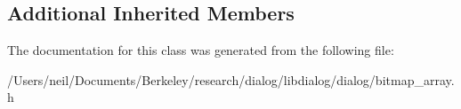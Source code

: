 \subsection*{Additional Inherited Members}


The documentation for this class was generated from the following file\+:\begin{DoxyCompactItemize}
\item 
/\+Users/neil/\+Documents/\+Berkeley/research/dialog/libdialog/dialog/bitmap\+\_\+array.\+h\end{DoxyCompactItemize}
